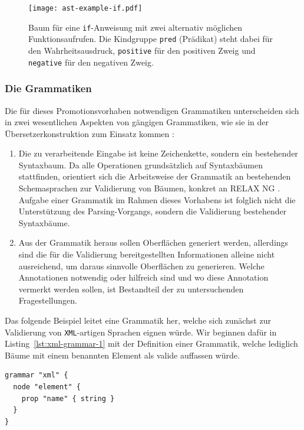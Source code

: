 \documentclass[paper=a4,fontsize=11pt,parskip=half]{scrartcl}
\begin{document}
\begin{figure}[p]
  \centering\texttt{[image: ast-example-if.pdf]}
  \caption{Baum für eine \texttt{if}-Anweisung mit zwei alternativ möglichen Funktionsaufrufen. Die Kindgruppe \texttt{pred} (Prädikat) steht dabei für den Wahrheitsausdruck, \texttt{positive} für den positiven Zweig und \texttt{negative} für den negativen Zweig.}
  \label{fig:ast-example-if}
\end{figure}

\subsubsection{Die Grammatiken}
\label{sec:grammars}

Die für dieses Promotionsvorhaben notwendigen Grammatiken unterscheiden sich in zwei wesentlichen Aspekten von gängigen Grammatiken, wie sie in der Übersetzerkonstruktion zum Einsatz kommen \cite[S. 42ff]{aho_compilers:_2007}:

\begin{enumerate}
\item Die zu verarbeitende Eingabe ist keine Zeichenkette, sondern ein bestehender Syntaxbaum. Da alle Operationen grundsätzlich auf Syntaxbäumen stattfinden, orientiert sich die Arbeitsweise der Grammatik an bestehenden Schemasprachen zur Validierung von Bäumen, konkret an RELAX NG \cite{clark_relax_2001}. Aufgabe einer Grammatik im Rahmen dieses Vorhabens ist folglich nicht die Unterstützung des Parsing-Vorgangs, sondern die Validierung bestehender Syntaxbäume.
\item Aus der Grammatik heraus sollen Oberflächen generiert werden, allerdings sind die für die Validierung bereitgestellten Informationen alleine nicht ausreichend, um daraus sinnvolle Oberflächen zu generieren. Welche Annotationen notwendig oder hilfreich sind und wo diese Annotation vermerkt werden sollen, ist Bestandteil der zu untersuchenden Fragestellungen.
\end{enumerate}

Das folgende Beispiel leitet eine Grammatik her, welche sich zunächst zur Validierung von \texttt{XML}-artigen Sprachen eignen würde. Wir beginnen dafür in Listing~\ref{lst:xml-grammar-1} mit der Definition einer Grammatik, welche lediglich Bäume mit einem benannten Element als valide auffassen würde.

\begin{lstlisting}[float=h, label={lst:xml-grammar-1},caption={\texttt{XML} Schritt 1 - Elemente mit Namen},captionpos=b,language={Grammar}]
grammar "xml" {
  node "element" {
    prop "name" { string }
  }
}
\end{lstlisting}
\end{document}
